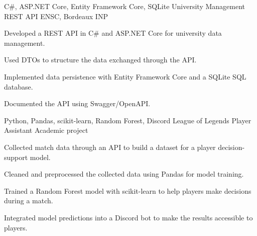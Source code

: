 
\begin{cventries}
  \cventry
    {C\#, ASP.NET Core, Entity Framework Core, SQLite}
    {University Management REST API}
    {ENSC, Bordeaux INP}
    {}
    {
      \begin{cvitems}
        \item {Developed a REST API in C\# and ASP.NET Core for university data management.}
        \item {Used DTOs to structure the data exchanged through the API.}
        \item {Implemented data persistence with Entity Framework Core and a SQLite SQL database.}
        \item {Documented the API using Swagger/OpenAPI.}
      \end{cvitems}
    }

  \cventry
    {Python, Pandas, scikit-learn, Random Forest, Discord}
    {League of Legends Player Assistant}
    {Academic project}
    {}
    {
      \begin{cvitems}
        \item {Collected match data through an API to build a dataset for a player decision-support model.}
        \item {Cleaned and preprocessed the collected data using Pandas for model training.}
        \item {Trained a Random Forest model with scikit-learn to help players make decisions during a match.}
        \item {Integrated model predictions into a Discord bot to make the results accessible to players.}
      \end{cvitems}
    }
\end{cventries}
